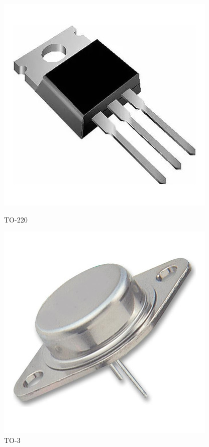 \documentclass[chaptersright]{informeutn}
\begin{document}
          \begin{figure}[H]
            \centering
            \begin{minipage}[b]{0.15\textwidth}
                \centering
                \includegraphics[width=\textwidth]{pictures/to220.jpg}
                \caption*{TO-220}
            \end{minipage}
            \hspace{1cm}
            \begin{minipage}[b]{0.15\textwidth}
                \centering
                \includegraphics[width=\textwidth]{pictures/to3.jpg}
                \caption*{TO-3}
            \end{minipage}
          \end{figure}
\end{document}
